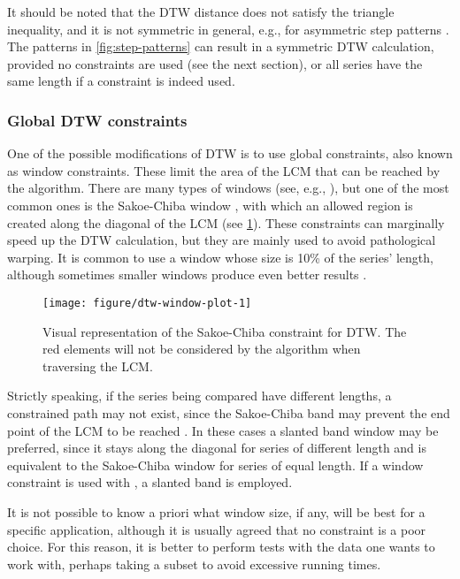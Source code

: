 It should be noted that the DTW distance does not satisfy the triangle inequality,
and it is not symmetric in general,
e.g., for asymmetric step patterns \citep{giorgino2009}.
The patterns in \cref{fig:step-patterns} can result in a symmetric DTW calculation,
provided no constraints are used (see the next section),
or all series have the same length if a constraint is indeed used.

\subsubsection{Global DTW constraints}
\label{sec:dtw-window}

One of the possible modifications of DTW is to use global constraints,
also known as window constraints.
These limit the area of the LCM that can be reached by the algorithm.
There are many types of windows (see, e.g., \citet{giorgino2009}),
but one of the most common ones is the Sakoe-Chiba window \citep{sakoe1978},
with which an allowed region is created along the diagonal of the LCM (see \cref{fig:dtw-window-plot}).
These constraints can marginally speed up the DTW calculation,
but they are mainly used to avoid pathological warping.
It is common to use a window whose size is 10\% of the series' length,
although sometimes smaller windows produce even better results \citep{keogh2004}.

\begin{figure}[htbp]

{\centering \texttt{[image: figure/dtw-window-plot-1]}

}

\caption{Visual representation of the Sakoe-Chiba constraint for DTW. The red elements will not be considered by the algorithm when traversing the LCM.}\label{fig:dtw-window-plot}
\end{figure}

Strictly speaking,
if the series being compared have different lengths,
a constrained path may not exist,
since the Sakoe-Chiba band may prevent the end point of the LCM to be reached \citep{giorgino2009}.
In these cases a slanted band window may be preferred,
since it stays along the diagonal for series of different length and is equivalent to the Sakoe-Chiba window for series of equal length.
If a window constraint is used with \dtwclust{},
a slanted band is employed.

It is not possible to know a priori what window size, if any, will be best for a specific application,
although it is usually agreed that no constraint is a poor choice.
For this reason, it is better to perform tests with the data one wants to work with,
perhaps taking a subset to avoid excessive running times.


